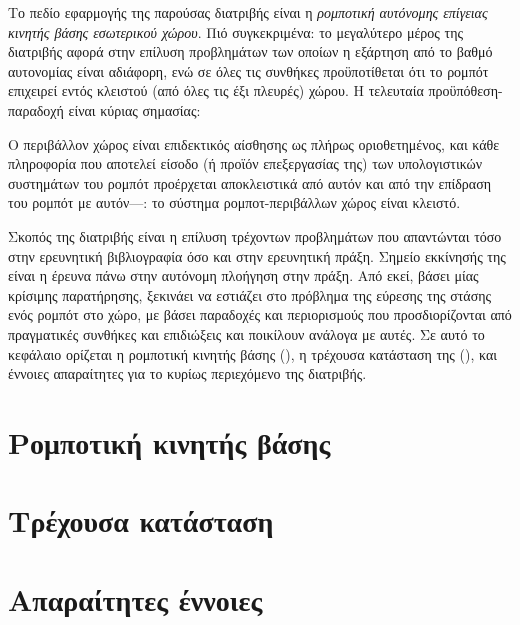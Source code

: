 Το πεδίο εφαρμογής της παρούσας διατριβής είναι η \textit{ρομποτική αυτόνομης
επίγειας κινητής βάσης εσωτερικού χώρου}. Πιό συγκεκριμένα: το μεγαλύτερο μέρος
της διατριβής αφορά στην επίλυση προβλημάτων των οποίων η εξάρτηση από το βαθμό
αυτονομίας είναι αδιάφορη, ενώ σε όλες τις συνθήκες προϋποτίθεται ότι το
ρομπότ επιχειρεί εντός κλειστού (από όλες τις έξι πλευρές) χώρου. Η τελευταία
προϋπόθεση-παραδοχή είναι κύριας σημασίας:

\begin{remark}
Ο περιβάλλον χώρος είναι επιδεκτικός αίσθησης ως πλήρως οριοθετημένος, και κάθε
πληροφορία που αποτελεί είσοδο (ή προϊόν επεξεργασίας της) των υπολογιστικών
συστημάτων του ρομπότ προέρχεται αποκλειστικά από αυτόν και από την επίδραση
του ρομπότ με αυτόν---: το σύστημα ρομποτ-περιβάλλων χώρος είναι κλειστό.
\end{remark}

Σκοπός της διατριβής είναι η επίλυση τρέχοντων προβλημάτων που απαντώνται τόσο
στην ερευνητική βιβλιογραφία όσο και στην ερευνητική πράξη. Σημείο εκκίνησής της
είναι η έρευνα πάνω στην αυτόνομη πλοήγηση στην πράξη. Από εκεί, βάσει μίας
κρίσιμης παρατήρησης, ξεκινάει να εστιάζει στο πρόβλημα της εύρεσης της στάσης
ενός ρομπότ στο χώρο, με βάσει παραδοχές και περιορισμούς που προσδιορίζονται
από πραγματικές συνθήκες και επιδιώξεις και ποικίλουν ανάλογα με αυτές. Σε αυτό
το κεφάλαιο ορίζεται η ρομποτική κινητής βάσης (), η τρέχουσα κατάσταση της (),
και έννοιες απαραίτητες για το κυρίως περιεχόμενο της διατριβής.



\section{Ρομποτική κινητής βάσης}


\section{Τρέχουσα κατάσταση}


\section{Απαραίτητες έννοιες}

